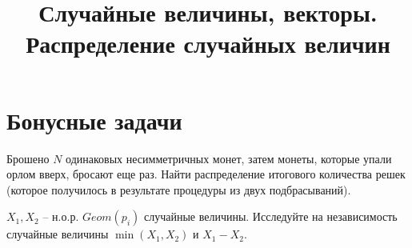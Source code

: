 

\title{Случайные величины, векторы. Распределение случайных величин}
\date{\vspace{-1cm}}


\maketitle

\section*{Бонусные задачи}
\begin{problem}
    Брошено $N$ одинаковых несимметричных монет, затем монеты, которые упали орлом вверх, бросают
еще раз.
    Найти распределение итогового количества решек (которое получилось в результате процедуры из двух подбрасываний).
\end{problem}



\begin{problem}
    $X_1, X_2$ -- н.о.р. $Geom(p_i)$ случайные величины.
    Исследуйте на независимость случайные величины $\min(X_1, X_2)$ и $X_1 - X_2$.
\end{problem}



